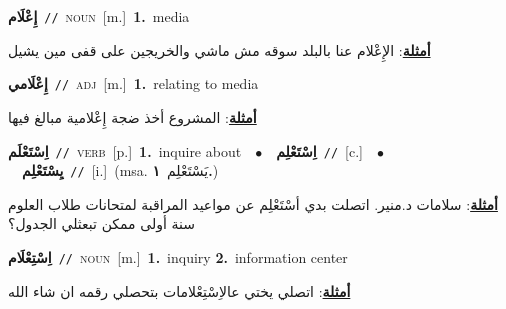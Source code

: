 \documentclass[10pt,a4paper,twoside]{article} %
\begin{document}
\begin{multicols}{2}
{\setlength\topsep{0pt}\textbf{\foreignlanguage{arabic}{إِعْلَام}}\ {\color{gray}\texttt{//}\color{black}}\ \textsc{noun}\ [m.]\ \textbf{1.}~media\  \begin{flushright}\color{gray}\foreignlanguage{arabic}{\textbf{\underline{\foreignlanguage{arabic}{أمثلة}}}: الإِعْلام عنا بالبلد سوقه مش ماشي والخريجين على قفى مين يشيل}\end{flushright}\color{black}} \vspace{2mm}

{\setlength\topsep{0pt}\textbf{\foreignlanguage{arabic}{إِعْلَامي}}\ {\color{gray}\texttt{//}\color{black}}\ \textsc{adj}\ [m.]\ \textbf{1.}~relating to media\  \begin{flushright}\color{gray}\foreignlanguage{arabic}{\textbf{\underline{\foreignlanguage{arabic}{أمثلة}}}: المشروع أخذ ضجة إِعْلامية مبالغ فيها}\end{flushright}\color{black}} \vspace{2mm}

{\setlength\topsep{0pt}\textbf{\foreignlanguage{arabic}{اِسْتَعْلَم}}\ {\color{gray}\texttt{//}\color{black}}\ \textsc{verb}\ [p.]\ \textbf{1.}~inquire about\ \ $\bullet$\ \ \setlength\topsep{0pt}\textbf{\foreignlanguage{arabic}{اِسْتَعْلِم}}\ {\color{gray}\texttt{//}\color{black}}\ [c.]\ \ $\bullet$\ \ \setlength\topsep{0pt}\textbf{\foreignlanguage{arabic}{يِسْتَعْلِم}}\ {\color{gray}\texttt{//}\color{black}}\ [i.]\ \color{gray}(msa. \foreignlanguage{arabic}{يَسْتَعْلِم}~\foreignlanguage{arabic}{\textbf{١.}})\color{black}\  \begin{flushright}\color{gray}\foreignlanguage{arabic}{\textbf{\underline{\foreignlanguage{arabic}{أمثلة}}}: سلامات د.منير. اتصلت بدي أسْتَعْلِم عن مواعيد المراقبة لمتحانات طلاب العلوم سنة أولى ممكن تبعثلي الجدول؟}\end{flushright}\color{black}} \vspace{2mm}

{\setlength\topsep{0pt}\textbf{\foreignlanguage{arabic}{اِسْتِعْلَام}}\ {\color{gray}\texttt{//}\color{black}}\ \textsc{noun}\ [m.]\ \textbf{1.}~inquiry  \textbf{2.}~information center\  \begin{flushright}\color{gray}\foreignlanguage{arabic}{\textbf{\underline{\foreignlanguage{arabic}{أمثلة}}}: اتصلي يختي عالاِسْتِعْلامات بتحصلي رقمه ان شاء الله}\end{flushright}\color{black}} \vspace{2mm}


\end{multicols}
\end{document}

